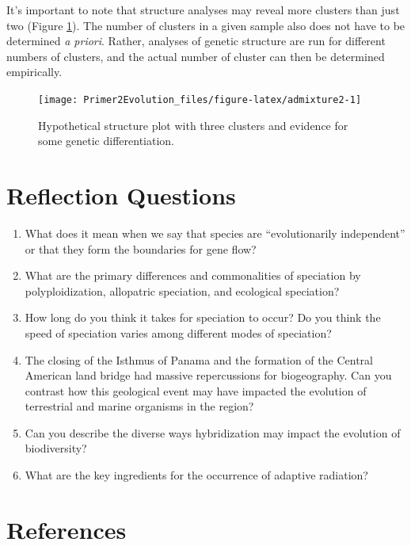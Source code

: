 \documentclass[
]{book}
\begin{document}
It's important to note that structure analyses may reveal more clusters than just two (Figure \ref{fig:admixture2}). The number of clusters in a given sample also does not have to be determined \emph{a priori}. Rather, analyses of genetic structure are run for different numbers of clusters, and the actual number of cluster can then be determined empirically.

\begin{figure}
\texttt{[image: Primer2Evolution\_files/figure-latex/admixture2-1]} \caption{ Hypothetical structure plot with three clusters and evidence for some genetic differentiation.}\label{fig:admixture2}
\end{figure}

\hypertarget{reflection-questions-10}{%
\section{Reflection Questions}\label{reflection-questions-10}}

\begin{enumerate}
\def\labelenumi{\arabic{enumi}.}
\item
  What does it mean when we say that species are ``evolutionarily independent'' or that they form the boundaries for gene flow?
\item
  What are the primary differences and commonalities of speciation by polyploidization, allopatric speciation, and ecological speciation?
\item
  How long do you think it takes for speciation to occur? Do you think the speed of speciation varies among different modes of speciation?
\item
  The closing of the Isthmus of Panama and the formation of the Central American land bridge had massive repercussions for biogeography. Can you contrast how this geological event may have impacted the evolution of terrestrial and marine organisms in the region?
\item
  Can you describe the diverse ways hybridization may impact the evolution of biodiversity?
\item
  What are the key ingredients for the occurrence of adaptive radiation?
\end{enumerate}

\hypertarget{references-11}{%
\section{References}\label{references-11}}
\end{document}
